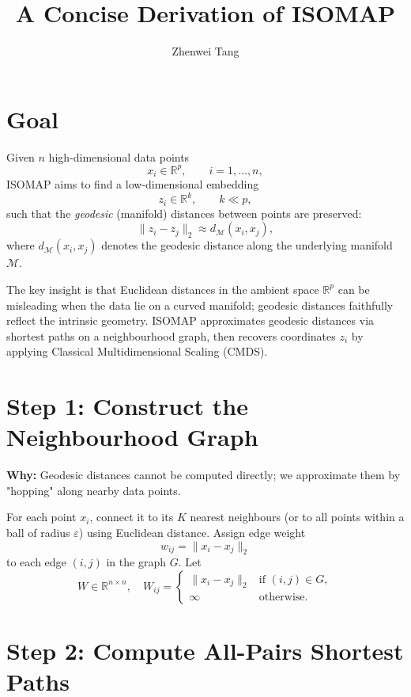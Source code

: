 \documentclass[11pt]{article}
\begin{document}
\title{A Concise Derivation of ISOMAP}
\author{Zhenwei Tang}
\date{}
\maketitle

\section*{Goal}

Given $n$ high-dimensional data points
\[
  x_i \in \mathbb{R}^p, \qquad i = 1, \dots, n,
\]
ISOMAP aims to find a low-dimensional embedding
\[
  z_i \in \mathbb{R}^k, \qquad k \ll p,
\]
such that the \emph{geodesic} (manifold) distances between points are preserved:
\[
  \|z_i - z_j\|_2 \approx d_{\mathcal{M}}(x_i, x_j),
\]
where $d_{\mathcal{M}}(x_i, x_j)$ denotes the geodesic distance along the underlying
manifold $\mathcal{M}$.

The key insight is that Euclidean distances in the ambient space $\mathbb{R}^p$ can
be misleading when the data lie on a curved manifold; geodesic distances faithfully
reflect the intrinsic geometry. ISOMAP approximates geodesic distances via shortest
paths on a neighbourhood graph, then recovers coordinates $z_i$ by applying
Classical Multidimensional Scaling (CMDS).

\section*{Step 1: Construct the Neighbourhood Graph}

\textbf{Why:} Geodesic distances cannot be computed directly; we approximate them by
"hopping" along nearby data points.

For each point $x_i$, connect it to its $K$ nearest neighbours (or to all points
within a ball of radius $\varepsilon$) using Euclidean distance. Assign edge weight
\[
  w_{ij} = \|x_i - x_j\|_2
\]
to each edge $(i,j)$ in the graph $G$. Let
\[
  W \in \mathbb{R}^{n \times n}, \quad W_{ij} =
  \begin{cases} \|x_i - x_j\|_2 & \text{if } (i,j) \in G, \\ \infty & \text{otherwise.} \end{cases}
\]

\section*{Step 2: Compute All-Pairs Shortest Paths}
\end{document}
